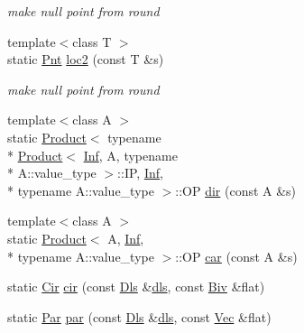 \begin{DoxyCompactItemize}
\begin{DoxyCompactList}\small\item\em make null point from round \end{DoxyCompactList}\item 
\hypertarget{structvsr_1_1_ro_a5c1877e3e857de37acf0f90bd98f756f}{{\footnotesize template$<$class T $>$ }\\static \hyperlink{namespacevsr_a2d05beb9721c5d9211b479af6d47222d}{Pnt} \hyperlink{structvsr_1_1_ro_a5c1877e3e857de37acf0f90bd98f756f}{loc2} (const T \&s)}\label{structvsr_1_1_ro_a5c1877e3e857de37acf0f90bd98f756f}

\begin{DoxyCompactList}\small\item\em make null point from round \end{DoxyCompactList}\item 
{\footnotesize template$<$class A $>$ }\\static \hyperlink{structvsr_1_1_product}{Product}$<$ typename \\*
\hyperlink{structvsr_1_1_product}{Product}$<$ \hyperlink{namespacevsr_ada8b0256ac30adae62e72c0309b72567}{Inf}, A, typename \\*
A\-::value\-\_\-type $>$\-::I\-P, \hyperlink{namespacevsr_ada8b0256ac30adae62e72c0309b72567}{Inf}, \\*
typename A\-::value\-\_\-type $>$\-::O\-P \hyperlink{structvsr_1_1_ro_a4d21f9b51427f771dae19587336767f1}{dir} (const A \&s)
\item 
{\footnotesize template$<$class A $>$ }\\static \hyperlink{structvsr_1_1_product}{Product}$<$ A, \hyperlink{namespacevsr_ada8b0256ac30adae62e72c0309b72567}{Inf}, \\*
typename A\-::value\-\_\-type $>$\-::O\-P \hyperlink{structvsr_1_1_ro_a70cb212da83acc5eab811d68b5945d70}{car} (const A \&s)
\item 
static \hyperlink{namespacevsr_a2744605aa828e495fc85463b7ae0d045}{Cir} \hyperlink{structvsr_1_1_ro_af1a521e5ea2054d0b449e48ac91892cc}{cir} (const \hyperlink{classvsr_1_1_m_v}{Dls} \&\hyperlink{structvsr_1_1_ro_a38ad7d450cb8387524c17fda3a3064f2}{dls}, const \hyperlink{namespacevsr_ab2f5aee828c6c805b8a86a5b077d192c}{Biv} \&flat)
\item 
static \hyperlink{namespacevsr_ae046793ece205351429a6346a66fd6eb}{Par} \hyperlink{structvsr_1_1_ro_af72582a4eaf81d72aec988c5bc986160}{par} (const \hyperlink{classvsr_1_1_m_v}{Dls} \&\hyperlink{structvsr_1_1_ro_a38ad7d450cb8387524c17fda3a3064f2}{dls}, const \hyperlink{namespacevsr_a0d061c30ac198a710a1b92dd8b343273}{Vec} \&flat)

\end{DoxyCompactItemize}
